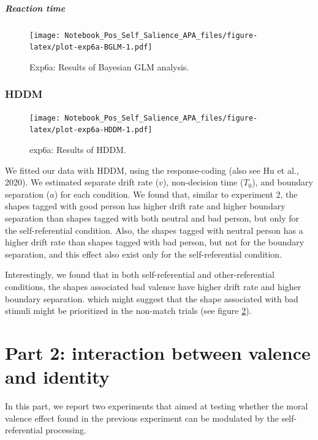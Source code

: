\documentclass[
  english,
  man]{apa6}
\let\oldsubparagraph\subparagraph
\renewcommand{\subparagraph}[1]{\oldsubparagraph{#1}\mbox{}}
\begin{document}
\hypertarget{reaction-time-3}{%
\subparagraph{Reaction time}\label{reaction-time-3}}

\begin{figure}
\centering
\texttt{[image: Notebook\_Pos\_Self\_Salience\_APA\_files/figure-latex/plot-exp6a-BGLM-1.pdf]}
\caption{\label{fig:plot-exp6a-BGLM}Exp6a: Results of Bayesian GLM analysis.}
\end{figure}

\hypertarget{hddm-4}{%
\subsubsection{HDDM}\label{hddm-4}}

\begin{figure}
\centering
\texttt{[image: Notebook\_Pos\_Self\_Salience\_APA\_files/figure-latex/plot-exp6a-HDDM-1.pdf]}
\caption{\label{fig:plot-exp6a-HDDM}exp6a: Results of HDDM.}
\end{figure}

We fitted our data with HDDM, using the response-coding (also see Hu et al., 2020). We estimated separate drift rate (\(v\)), non-decision time (\(T_{0}\)), and boundary separation (\(a\)) for each condition. We found that, similar to experiment 2, the shapes tagged with good person has higher drift rate and higher boundary separation than shapes tagged with both neutral and bad person, but only for the self-referential condition. Also, the shapes tagged with neutral person has a higher drift rate than shapes tagged with bad person, but not for the boundary separation, and this effect also exist only for the self-referential condition.

Interestingly, we found that in both self-referential and other-referential conditions, the shapes associated bad valence have higher drift rate and higher boundary separation. which might suggest that the shape associated with bad stimuli might be prioritized in the non-match trials (see figure \ref{fig:plot-exp6a-HDDM}).

\hypertarget{part-2-interaction-between-valence-and-identity}{%
\section{Part 2: interaction between valence and identity}\label{part-2-interaction-between-valence-and-identity}}

In this part, we report two experiments that aimed at testing whether the moral valence effect found in the previous experiment can be modulated by the self-referential processing.
\end{document}
